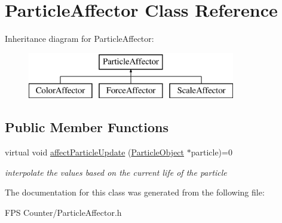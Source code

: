 \hypertarget{class_particle_affector}{}\section{Particle\+Affector Class Reference}
\label{class_particle_affector}
Inheritance diagram for Particle\+Affector\+:\begin{figure}[H]
\begin{center}
\leavevmode
\includegraphics[height=2.000000cm]{class_particle_affector}
\end{center}
\end{figure}
\subsection*{Public Member Functions}
\begin{DoxyCompactItemize}
\item 
\mbox{\label{class_particle_affector_aa4331fb5ef547b3dd57067b2d2c6a5d9}} 
virtual void \mbox{\hyperlink{class_particle_affector_aa4331fb5ef547b3dd57067b2d2c6a5d9}{affect\+Particle\+Update}} (\mbox{\hyperlink{class_particle_object}{Particle\+Object}} $\ast$particle)=0
\begin{DoxyCompactList}\small\item\em interpolate the values based on the current life of the particle \end{DoxyCompactList}\end{DoxyCompactItemize}


The documentation for this class was generated from the following file\+:\begin{DoxyCompactItemize}
\item 
F\+P\+S Counter/Particle\+Affector.\+h\end{DoxyCompactItemize}
